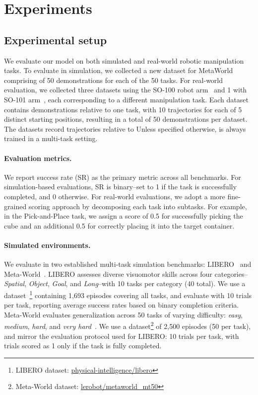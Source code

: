 \section{Experiments}

\subsection{Experimental setup}
We evaluate our model on both simulated and real-world robotic manipulation tasks. 
To evaluate \ours in simulation, we collected a new dataset for MetaWorld~\citep{yu2020metaworld} comprising of 50 demonstrations for each of the 50 tasks.
For real-world evaluation, we collected three datasets using the SO-100 robot arm~\citep{Knight_Standard_Open_SO-100} and 1 with SO-101 arm~\citep{Knight_Standard_Open_SO-100}, each corresponding to a different manipulation task. Each dataset contains demonstrations relative to one task, with 10 trajectories for each of 5 distinct starting positions, resulting in a total of 50 demonstrations per dataset. The datasets record trajectories relative to
Unless specified otherwise, \ours is always trained in a multi-task setting.

\paragraph{Evaluation metrics.} We report success rate (SR) as the primary metric across all benchmarks. For simulation-based evaluations, SR is binary--set to 1 if the task is successfully completed, and 0 otherwise. For real-world evaluations, we adopt a more fine-grained scoring approach by decomposing each task into subtasks. For example, in the Pick-and-Place task, we assign a score of 0.5 for successfully picking the cube and an additional 0.5 for correctly placing it into the target container.

\paragraph{Simulated environments.}
We evaluate \ours in two established multi-task simulation benchmarks: LIBERO~\citep{liu2023libero} and Meta-World~\citep{yu2020metaworld}. LIBERO assesses diverse visuomotor skills across four categories--\textit{Spatial}, \textit{Object}, \textit{Goal}, and \textit{Long}--with 10 tasks per category (40 total). We use a dataset~\citep{kimopenvla,pertsch2025fast}\footnote{LIBERO dataset: \href{https://huggingface.co/datasets/physical-intelligence/libero}{physical-intelligence/libero}} containing 1,693 episodes covering all tasks, and evaluate with 10 trials per task, reporting average success rates based on binary completion criteria. 
Meta-World evaluates generalization across 50 tasks of varying difficulty: \textit{easy}, \textit{medium}, \textit{hard}, and \textit{very hard}~\citep{seo2023masked}. We use a dataset\footnote{Meta-World dataset: \href{https://huggingface.co/datasets/lerobot/metaworld_mt50}{lerobot/metaworld\_mt50}} of 2,500 episodes (50 per task), and mirror the evaluation protocol used for LIBERO: 10 trials per task, with trials scored as 1 only if the task is fully completed.

